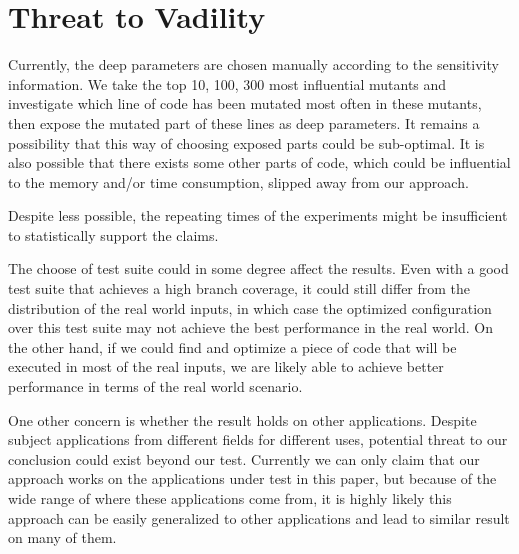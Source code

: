 \section{Threat to Vadility}

Currently, the deep parameters are chosen manually according to the sensitivity information. We take the top 10, 100, 300 most influential mutants and investigate which line of code has been mutated most often in these mutants, then expose the mutated part of these lines as deep parameters. It remains a possibility that this way of choosing exposed parts could be sub-optimal. It is also possible that there exists some other parts of code, which could be influential to the memory and/or time consumption, slipped away from our approach. 

Despite less possible, the repeating times of the experiments might be insufficient to statistically support the claims. 

The choose of test suite could in some degree affect the results. Even with a good test suite that achieves a high branch coverage, it could still differ from the distribution of the real world inputs, in which case the optimized configuration over this test suite may not achieve the best performance in the real world. On the other hand, if we could find and optimize a piece of code that will be executed in most of the real inputs, we are likely able to achieve better performance in terms of the real world scenario.

One other concern is whether the result holds on other applications. Despite subject applications from different fields for different uses, potential threat to our conclusion could exist beyond our test. Currently we can only claim that our approach works on the applications under test in this paper, but because of the wide range of where these applications come from, it is highly likely this approach can be easily generalized to other applications and lead to similar result on many of them.

